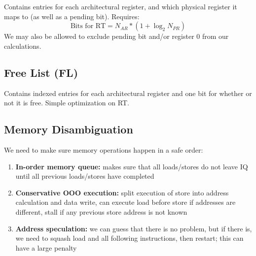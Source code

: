 \documentclass{article}
\begin{document}
Contains entries for each architectural register, and which physical register it maps to (as well as a pending bit). Requires:
$$ \text{Bits for RT} = N_{AR} * (1 + \log_2 N_{PR}) $$
We may also be allowed to exclude pending bit and/or register 0 from our calculations.

\subsection{Free List (FL)}

Contains indexed entries for each architectural register and one bit for whether or not it is free. Simple optimization on RT.

\subsection{Memory Disambiguation}

We need to make sure memory operations happen in a safe order:
\begin{enumerate}
\item \textbf{In-order memory queue:} makes sure that all loads/stores do not leave IQ until all previous loads/stores have completed
\item \textbf{Conservative OOO execution:} split execution of store into address calculation and data write, can execute load before store if addresses are different, stall if any previous store address is not known
\item \textbf{Address speculation:} we can guess that there is no problem, but if there is, we need to squash load and all following instructions, then restart; this can have a large penalty
\end{enumerate}
\end{document}
